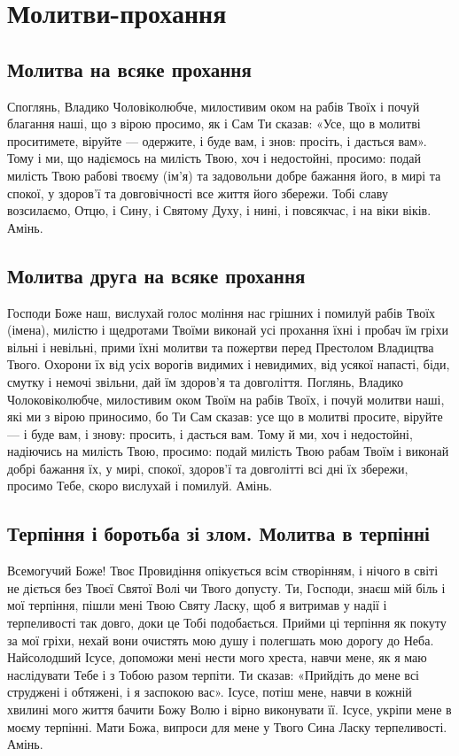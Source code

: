 \documentclass[chapters.tex]{subfiles}
\begin{document}
\chapter{Молитви-прохання}
\section{Молитва на всяке прохання}
Споглянь, Владико Чоловіколюбче, милостивим оком на рабів Твоїх і почуй благання наші, що з вірою просимо, як і Сам Ти сказав: «Усе, що в молитві проситимете, віруйте — одержите, і буде вам, і знов: просіть, і дасться вам». Тому і ми, що надіємось на милість Твою, хоч і недостойні, просимо: подай милість Твою рабові твоєму (ім’я) та задовольни добре бажання його, в мирі та спокої, у здоров’ї та довговічності все життя його збережи. Тобі славу возсилаємо, Отцю, і Сину, і Святому Духу, і нині, і повсякчас, і на віки віків. Амінь.

\section{Молитва друга на всяке прохання}
Господи Боже наш, вислухай голос моління нас грішних і помилуй рабів Твоїх (імена), милістю і щедротами Твоїми виконай усі прохання їхні і пробач їм гріхи вільні і невільні, прими їхні молитви та пожертви перед Престолом Владицтва Твого. Охорони їх від усіх ворогів видимих і невидимих, від усякої напасті, біди, смутку і немочі звільни, дай їм здоров’я та довголіття. Поглянь, Владико Чолоковіколюбче, милостивим оком Твоїм на рабів Твоїх, і почуй молитви наші, які ми з вірою приносимо, бо Ти Сам сказав: усе що в молитві просите, віруйте — і буде вам, і знову: просить, і дасться вам. Тому й ми, хоч і недостойні, надіючись на милість Твою, просимо: подай милість Твою рабам Твоїм і виконай добрі бажання їх, у мирі, спокої, здоров’ї та довголітті всі дні їх збережи, просимо Тебе, скоро вислухай і помилуй. Амінь.

\section{Терпіння і боротьба зі злом. Молитва в терпінні}
Всемогучий Боже! Твоє Провидіння опікується всім створінням, і нічого в світі не діється без Твоєї Святої Волі чи Твого допусту. Ти, Господи, знаєш мій біль і мої терпіння, пішли мені Твою Святу Ласку, щоб я витримав у надії і терпеливості так довго, доки це Тобі подобається. Прийми ці терпіння як покуту за мої гріхи, нехай вони очистять мою душу і полегшать мою дорогу до Неба. Найсолодший Ісусе, допоможи мені нести мого хреста, навчи мене, як я маю наслідувати Тебе і з Тобою разом терпіти. Ти сказав: «Прийдіть до мене всі струджені і обтяжені, і я заспокою вас». Ісусе, потіш мене, навчи в кожній хвилині мого життя бачити Божу Волю і вірно виконувати її. Ісусе, укріпи мене в моєму терпінні. Мати Божа, випроси для мене у Твого Сина Ласку терпеливості. Амінь.
\end{document}
